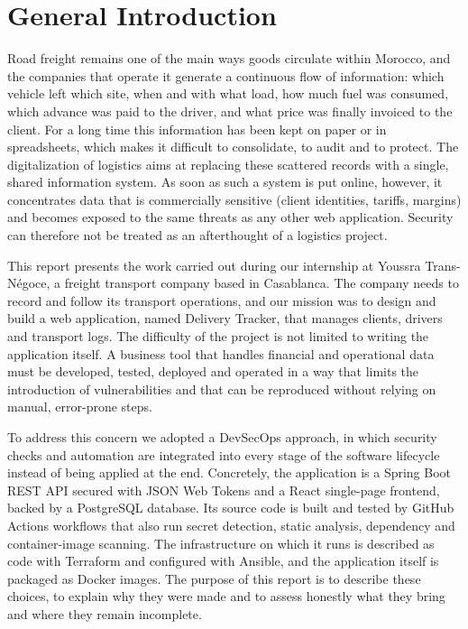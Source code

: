 \setcounter{page}{1}
\chapter*{General Introduction}

Road freight remains one of the main ways goods circulate within Morocco, and the companies that operate it generate a continuous flow of information: which vehicle left which site, when and with what load, how much fuel was consumed, which advance was paid to the driver, and what price was finally invoiced to the client. For a long time this information has been kept on paper or in spreadsheets, which makes it difficult to consolidate, to audit and to protect. The digitalization of logistics aims at replacing these scattered records with a single, shared information system. As soon as such a system is put online, however, it concentrates data that is commercially sensitive (client identities, tariffs, margins) and becomes exposed to the same threats as any other web application. Security can therefore not be treated as an afterthought of a logistics project.

This report presents the work carried out during our internship at Youssra Trans-Négoce, a freight transport company based in Casablanca. The company needs to record and follow its transport operations, and our mission was to design and build a web application, named Delivery Tracker, that manages clients, drivers and transport logs. The difficulty of the project is not limited to writing the application itself. A business tool that handles financial and operational data must be developed, tested, deployed and operated in a way that limits the introduction of vulnerabilities and that can be reproduced without relying on manual, error-prone steps.

To address this concern we adopted a DevSecOps approach, in which security checks and automation are integrated into every stage of the software lifecycle instead of being applied at the end. Concretely, the application is a Spring Boot REST API secured with JSON Web Tokens and a React single-page frontend, backed by a PostgreSQL database. Its source code is built and tested by GitHub Actions workflows that also run secret detection, static analysis, dependency and container-image scanning. The infrastructure on which it runs is described as code with Terraform and configured with Ansible, and the application itself is packaged as Docker images. The purpose of this report is to describe these choices, to explain why they were made and to assess honestly what they bring and where they remain incomplete.

